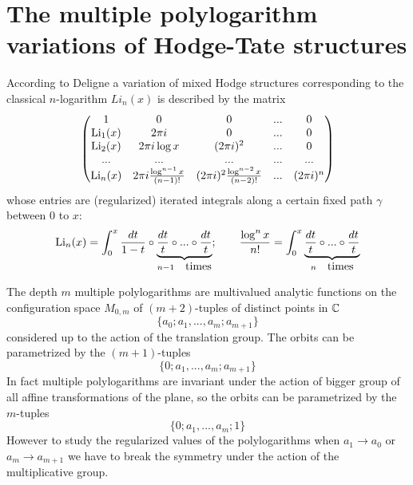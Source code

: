 \documentclass[10pt]{article}
\begin{document}
\section {The  multiple polylogarithm variations of Hodge-Tate  structures } 


According to Deligne  a variation of mixed Hodge structures corresponding to 
the classical $n$-logarithm 
$Li_n(x)$ is described by the matrix
\begin{equation} \label{4.20.01.1}
\left (\begin{matrix}1&0&0&... &0 \\ 
{\rm Li}_1(x)& 2 \pi i &0 &... & 0 \\ 
{\rm Li}_2(x) & 2 \pi i \log x & (2 \pi i)^2& ... & 0\\ 
    ...  
& ...&    ... & ... &...\\
{\rm Li}_n(x)& 2 \pi i \frac{\log^{n-1}x}{(n-1)!}&
(2 \pi i)^2 \frac{\log^{n-2}x}{(n-2)!} & ... & (2 \pi i)^n 
\\\end{matrix}\right ) 
\end{equation}
whose entries are (regularized) iterated integrals along a 
certain fixed path $\gamma$ between $0$ to $x$: 
$$
{\rm Li}_n(x) = \int_0^x\frac{dt}{1-t} \circ \underbrace{\frac{dt}{t}\circ ... \circ 
\frac{dt}{t}}_{n-1 \quad  \mbox{times}}; \qquad 
\frac{\log^{n}x}{n!} =   \int_0^x \underbrace{\frac{dt}{t} \circ  ... 
\circ\frac{dt}{t}}_{n \quad  \mbox{times}} 
$$

The depth $m$ multiple polylogarithms are multivalued analytic functions on 
the configuration space $M_{0,m}$  of  $(m+2)$-tuples  of   
distinct points in ${\mathbb C}$ 
\begin{equation} \label{+CONF}
\{a_0; a_1, ..., a_m; a_{m+1}\}
\end{equation}
considered up to  the action of the translation group. 
The orbits can be 
parametrized by the $(m+1)$-tuples 
\begin{equation} \label{++CONF}
\{0; a_1, ..., a_m; a_{m+1}\}  
\end{equation} 
In fact multiple polylogarithms are invariant under the action of bigger group of all 
affine transformations of the plane, so 
the orbits can be parametrized by the $m$-tuples 
\begin{equation} \label{++CONF+}
\{0; a_1, ..., a_m; 1\}
\end{equation}
However to study the regularized values of the polylogarithms when 
$a_1 \to a_0$ or $a_m \to a_{m+1}$  we 
have to break the symmetry under the 
action of the multiplicative group. 
\end{document}
